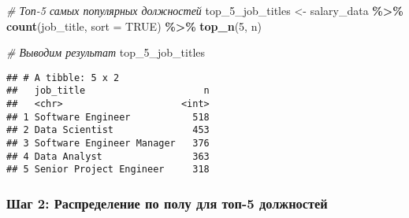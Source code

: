 \documentclass[
]{article}
\newenvironment{Shaded}{\begin{snugshade}}{\end{snugshade}}
\newcommand{\AttributeTok}[1]{\textcolor[rgb]{0.13,0.29,0.53}{#1}}
\newcommand{\CommentTok}[1]{\textcolor[rgb]{0.56,0.35,0.01}{\textit{#1}}}
\newcommand{\ConstantTok}[1]{\textcolor[rgb]{0.56,0.35,0.01}{#1}}
\newcommand{\DecValTok}[1]{\textcolor[rgb]{0.00,0.00,0.81}{#1}}
\newcommand{\FunctionTok}[1]{\textcolor[rgb]{0.13,0.29,0.53}{\textbf{#1}}}
\newcommand{\NormalTok}[1]{#1}
\newcommand{\OtherTok}[1]{\textcolor[rgb]{0.56,0.35,0.01}{#1}}
\newcommand{\SpecialCharTok}[1]{\textcolor[rgb]{0.81,0.36,0.00}{\textbf{#1}}}
\begin{document}
\begin{Shaded}
\begin{Highlighting}[]
\CommentTok{\# Топ{-}5 самых популярных должностей}
\NormalTok{top\_5\_job\_titles }\OtherTok{\textless{}{-}}\NormalTok{ salary\_data }\SpecialCharTok{\%\textgreater{}\%}
  \FunctionTok{count}\NormalTok{(job\_title, }\AttributeTok{sort =} \ConstantTok{TRUE}\NormalTok{) }\SpecialCharTok{\%\textgreater{}\%}
  \FunctionTok{top\_n}\NormalTok{(}\DecValTok{5}\NormalTok{, n)}

\CommentTok{\# Выводим результат}
\NormalTok{top\_5\_job\_titles}
\end{Highlighting}
\end{Shaded}

\begin{verbatim}
## # A tibble: 5 x 2
##   job_title                     n
##   <chr>                     <int>
## 1 Software Engineer           518
## 2 Data Scientist              453
## 3 Software Engineer Manager   376
## 4 Data Analyst                363
## 5 Senior Project Engineer     318
\end{verbatim}

\subsubsection{Шаг 2: Распределение по полу для топ-5
должностей}\label{ux448ux430ux433-2-ux440ux430ux441ux43fux440ux435ux434ux435ux43bux435ux43dux438ux435-ux43fux43e-ux43fux43eux43bux443-ux434ux43bux44f-ux442ux43eux43f-5-ux434ux43eux43bux436ux43dux43eux441ux442ux435ux439}

\begin{Shaded}
\end{Shaded}
\end{document}
